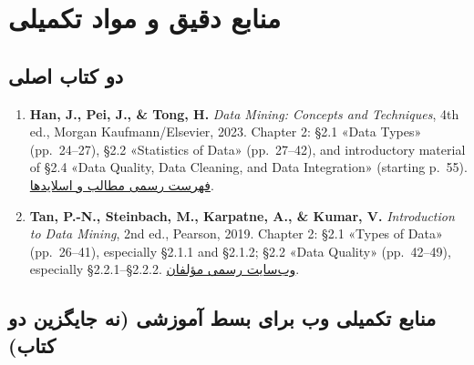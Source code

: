 \documentclass[12pt,a4paper,oneside]{book}
\providecommand{\tightlist}{\setlength{\itemsep}{0pt}\setlength{\parskip}{0pt}}
\begin{document}
\section{منابع دقیق و مواد تکمیلی}\label{ux645ux646ux627ux628ux639-ux62fux642ux6ccux642-ux648-ux645ux648ux627ux62f-ux62aux6a9ux645ux6ccux644ux6cc}

\subsection{دو کتاب اصلی}\label{ux62fux648-ux6a9ux62aux627ux628-ux627ux635ux644ux6cc}

\begin{enumerate}
\def\labelenumi{\arabic{enumi}.}
\tightlist
\item
  \textbf{Han, J., Pei, J., \& Tong, H.} \emph{Data Mining: Concepts and Techniques}, 4th ed., Morgan Kaufmann/Elsevier, 2023. Chapter 2: §2.1 «Data Types» (pp.~24--27), §2.2 «Statistics of Data» (pp.~27--42), and introductory material of §2.4 «Data Quality, Data Cleaning, and Data Integration» (starting p.~55). \href{https://hanj.cs.illinois.edu/bk4/bk4_slidesindex.htm}{فهرست رسمی مطالب و اسلایدها}.
\item
  \textbf{Tan, P.-N., Steinbach, M., Karpatne, A., \& Kumar, V.} \emph{Introduction to Data Mining}, 2nd ed., Pearson, 2019. Chapter 2: §2.1 «Types of Data» (pp.~26--41), especially §2.1.1 and §2.1.2; §2.2 «Data Quality» (pp.~42--49), especially §2.2.1--§2.2.2. \href{https://www-users.cse.umn.edu/~kumar001/dmbook/index.php}{وب‌سایت رسمی مؤلفان}.
\end{enumerate}

\subsection{منابع تکمیلی وب برای بسط آموزشی (نه جایگزین دو کتاب)}\label{ux645ux646ux627ux628ux639-ux62aux6a9ux645ux6ccux644ux6cc-ux648ux628-ux628ux631ux627ux6cc-ux628ux633ux637-ux622ux645ux648ux632ux634ux6cc-ux646ux647-ux62cux627ux6ccux6afux632ux6ccux646-ux62fux648-ux6a9ux62aux627ux628}
\end{document}
